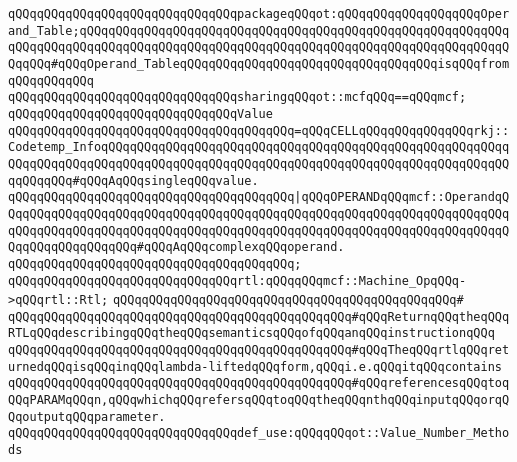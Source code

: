 \verb|qQQqqQQqqQQqqQQqqQQqqQQqqQQqqQQqpackageqQQqot:qQQqqQQqqQQqqQQqqQQqOperand_Table;qQQqqQQqqQQqqQQqqQQqqQQqqQQqqQQqqQQqqQQqqQQqqQQqqQQqqQQqqQQqqQQqqQQqqQQqqQQqqQQqqQQqqQQqqQQqqQQqqQQqqQQqqQQqqQQqqQQqqQQqqQQqqQQqqQQqqQQq#qQQqOperand_TableqQQqqQQqqQQqqQQqqQQqqQQqqQQqqQQqqQQqisqQQqfromqQQqqQQqqQQq|\newline
\newline
\verb|qQQqqQQqqQQqqQQqqQQqqQQqqQQqqQQqsharingqQQqot::mcfqQQq==qQQqmcf;|\newline
\newline
\verb|qQQqqQQqqQQqqQQqqQQqqQQqqQQqqQQqValue|\newline
\verb|qQQqqQQqqQQqqQQqqQQqqQQqqQQqqQQqqQQqqQQq=qQQqCELLqQQqqQQqqQQqqQQqrkj::Codetemp_InfoqQQqqQQqqQQqqQQqqQQqqQQqqQQqqQQqqQQqqQQqqQQqqQQqqQQqqQQqqQQqqQQqqQQqqQQqqQQqqQQqqQQqqQQqqQQqqQQqqQQqqQQqqQQqqQQqqQQqqQQqqQQqqQQqqQQqqQQq#qQQqAqQQqsingleqQQqvalue.|\newline
\verb|qQQqqQQqqQQqqQQqqQQqqQQqqQQqqQQqqQQqqQQq|\verb#|qQQqOPERANDqQQqmcf::OperandqQQqqQQqqQQqqQQqqQQqqQQqqQQqqQQqqQQqqQQqqQQqqQQqqQQqqQQqqQQqqQQqqQQqqQQqqQQqqQQqqQQqqQQqqQQqqQQqqQQqqQQqqQQqqQQqqQQqqQQqqQQqqQQqqQQqqQQqqQQqqQQqqQQqqQQqqQQqqQQq#\verb|#qQQqAqQQqcomplexqQQqoperand.|\newline
\verb|qQQqqQQqqQQqqQQqqQQqqQQqqQQqqQQqqQQqqQQq;|\newline
\newline
\newline
\verb|qQQqqQQqqQQqqQQqqQQqqQQqqQQqqQQqrtl:qQQqqQQqmcf::Machine_OpqQQq->qQQqrtl::Rtl;|\newline
\verb|qQQqqQQqqQQqqQQqqQQqqQQqqQQqqQQqqQQqqQQqqQQqqQQq#|\newline
\verb|qQQqqQQqqQQqqQQqqQQqqQQqqQQqqQQqqQQqqQQqqQQqqQQq#qQQqReturnqQQqtheqQQqRTLqQQqdescribingqQQqtheqQQqsemanticsqQQqofqQQqanqQQqinstructionqQQq|\newline
\verb|qQQqqQQqqQQqqQQqqQQqqQQqqQQqqQQqqQQqqQQqqQQqqQQq#qQQqTheqQQqrtlqQQqreturnedqQQqisqQQqinqQQqlambda-liftedqQQqform,qQQqi.e.qQQqitqQQqcontains|\newline
\verb|qQQqqQQqqQQqqQQqqQQqqQQqqQQqqQQqqQQqqQQqqQQqqQQq#qQQqreferencesqQQqtoqQQqPARAMqQQqn,qQQqwhichqQQqrefersqQQqtoqQQqtheqQQqnthqQQqinputqQQqorqQQqoutputqQQqparameter.|\newline
\newline
\newline
\verb|qQQqqQQqqQQqqQQqqQQqqQQqqQQqqQQqdef_use:qQQqqQQqot::Value_Number_Methods|\newline
